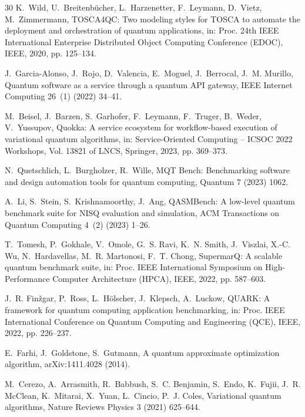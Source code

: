 \begin{thebibliography}{30}
K.~Wild, U.~Breitenb\"{u}cher, L.~Harzenetter, F.~Leymann, D.~Vietz,
M.~Zimmermann,
TOSCA4QC: Two modeling styles for TOSCA to automate the deployment and
orchestration of quantum applications,
in: Proc. 24th IEEE International Enterprise Distributed Object Computing
Conference (EDOC), IEEE, 2020, pp. 125--134.

J.~Garcia-Alonso, J.~Rojo, D.~Valencia, E.~Moguel, J.~Berrocal, J.~M. Murillo,
Quantum software as a service through a quantum API gateway,
IEEE Internet Computing 26~(1) (2022) 34--41.

M.~Beisel, J.~Barzen, S.~Garhofer, F.~Leymann, F.~Truger, B.~Weder,
V.~Yussupov,
Quokka: A service ecosystem for workflow-based execution of variational quantum
algorithms,
in: Service-Oriented Computing -- ICSOC 2022 Workshops, Vol. 13821 of LNCS,
Springer, 2023, pp. 369--373.

N.~Quetschlich, L.~Burgholzer, R.~Wille,
MQT Bench: Benchmarking software and design automation tools for quantum
computing,
Quantum 7 (2023) 1062.

A.~Li, S.~Stein, S.~Krishnamoorthy, J.~Ang,
QASMBench: A low-level quantum benchmark suite for NISQ evaluation and
simulation,
ACM Transactions on Quantum Computing 4~(2) (2023) 1--26.

T.~Tomesh, P.~Gokhale, V.~Omole, G.~S. Ravi, K.~N. Smith, J.~Viszlai,
X.-C. Wu, N.~Hardavellas, M.~R. Martonosi, F.~T. Chong,
SupermarQ: A scalable quantum benchmark suite,
in: Proc. IEEE International Symposium on High-Performance Computer
Architecture (HPCA), IEEE, 2022, pp. 587--603.

J.~R. Fin\v{z}gar, P.~Ross, L.~H\"{o}lscher, J.~Klepsch, A.~Luckow,
QUARK: A framework for quantum computing application benchmarking,
in: Proc. IEEE International Conference on Quantum Computing and Engineering
(QCE), IEEE, 2022, pp. 226--237.

E.~Farhi, J.~Goldstone, S.~Gutmann,
A quantum approximate optimization algorithm,
arXiv:1411.4028 (2014).

M.~Cerezo, A.~Arrasmith, R.~Babbush, S.~C. Benjamin, S.~Endo, K.~Fujii,
J.~R. McClean, K.~Mitarai, X.~Yuan, L.~Cincio, P.~J. Coles,
Variational quantum algorithms,
Nature Reviews Physics 3 (2021) 625--644.

\end{thebibliography}
